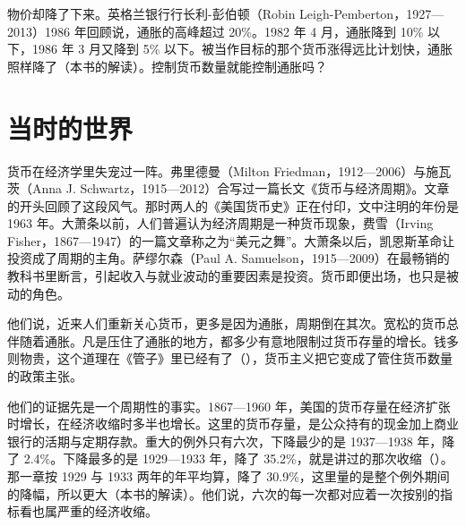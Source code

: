 物价却降了下来。英格兰银行行长利-彭伯顿（Robin Leigh-Pemberton，1927—2013）1986 年回顾说，通胀的高峰超过 20\%\cite{leighpemberton1986,loc45}。1982 年 4 月，通胀降到 10\% 以下，1986 年 3 月又降到 5\% 以下\cite{leighpemberton1986}。被当作目标的那个货币涨得远比计划快，通胀照样降了（本书的解读）。控制货币数量就能控制通胀吗？

\section{当时的世界}\label{sec:monetarism-world}

货币在经济学里失宠过一阵。弗里德曼（Milton Friedman，1912—2006）与施瓦茨（Anna J. Schwartz，1915—2012）合写过一篇长文《货币与经济周期》\cite{friedmanschwartz1963,loc45}。文章的开头回顾了这段风气。那时两人的《美国货币史》正在付印，文中注明的年份是 1963 年\cite{friedmanschwartz1963}。大萧条以前，人们普遍认为经济周期是一种货币现象，费雪（Irving Fisher，1867—1947）的一篇文章称之为“美元之舞”\cite{friedmanschwartz1963,loc45}。大萧条以后，凯恩斯革命让投资成了周期的主角。萨缪尔森（Paul A. Samuelson，1915—2009）在最畅销的教科书里断言，引起收入与就业波动的重要因素是投资\cite{friedmanschwartz1963,loc45}。货币即便出场，也只是被动的角色\cite{friedmanschwartz1963}。

他们说，近来人们重新关心货币，更多是因为通胀，周期倒在其次\cite{friedmanschwartz1963}。宽松的货币总伴随着通胀。凡是压住了通胀的地方，都多少有意地限制过货币存量的增长\cite{friedmanschwartz1963}。钱多则物贵，这个道理在《管子》里已经有了（），货币主义把它变成了管住货币数量的政策主张。

他们的证据先是一个周期性的事实。1867—1960 年，美国的货币存量在经济扩张时增长，在经济收缩时多半也增长\cite{friedmanschwartz1963}。这里的货币存量，是公众持有的现金加上商业银行的活期与定期存款\cite{friedmanschwartz1963}。重大的例外只有六次，下降最少的是 1937—1938 年，降了 2.4\%\cite{friedmanschwartz1963}。下降最多的是 1929—1933 年，降了 35.2\%，就是讲过的那次收缩（）\cite{friedmanschwartz1963}。那一章按 1929 与 1933 两年的年平均算，降了 30.9\%，这里量的是整个例外期间的降幅，所以更大（本书的解读）。他们说，六次的每一次都对应着一次按别的指标看也属严重的经济收缩\cite{friedmanschwartz1963}。

